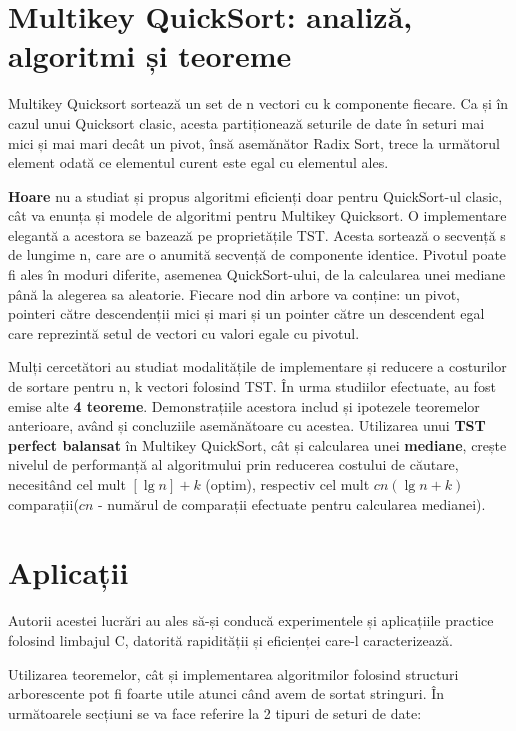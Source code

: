 \documentclass[12pt,a4paper]{article}
\begin{document}
\begin{singlespace}
\section{Multikey QuickSort: analiză, algoritmi și teoreme}
Multikey Quicksort sortează un set de n vectori cu k componente fiecare. Ca și în cazul unui Quicksort clasic, acesta partiționează seturile de date în seturi mai mici și mai mari decât un pivot, însă asemănător Radix Sort, trece la următorul element odată ce elementul curent este egal cu elementul ales. 
\par
\textbf{Hoare} nu a studiat și propus algoritmi eficienți doar pentru QuickSort-ul clasic, cât va enunța și modele de algoritmi pentru Multikey Quicksort. O implementare elegantă a acestora se bazează pe proprietățile TST. Acesta sortează o secvență s de lungime n, care are o anumită secvență de componente identice. Pivotul poate fi ales în moduri diferite, asemenea QuickSort-ului, de la calcularea unei mediane până la alegerea sa aleatorie. Fiecare nod din arbore va conține: un pivot, pointeri către descendenții mici și mari și un pointer către un descendent egal care reprezintă setul de vectori cu valori egale cu pivotul.
\par
Mulți cercetători au studiat modalitățile de implementare și reducere a costurilor de sortare pentru n, k vectori folosind TST. În urma studiilor efectuate, au fost emise alte \textbf{4 teoreme}. Demonstrațiile acestora includ și ipotezele teoremelor anterioare, având și concluziile asemănătoare cu acestea. Utilizarea unui \textbf{TST perfect balansat} în Multikey QuickSort, cât și calcularea unei \textbf{mediane}, crește nivelul de performanță al algoritmului prin reducerea costului de căutare, necesitând cel mult \([\lg n] + k\) (optim), respectiv cel mult \(cn(\lg n + k)\) comparații(\(cn\) - numărul de comparații efectuate pentru calcularea medianei).


\section{Aplicații}
Autorii acestei lucrări au ales să-și conducă experimentele și aplicațiile practice folosind limbajul C, datorită rapidității și eficienței care-l caracterizează. 

\par
Utilizarea teoremelor, cât și implementarea algoritmilor folosind structuri arborescente pot fi foarte utile atunci când avem de sortat stringuri.
În următoarele secțiuni se va face referire la 2 tipuri de seturi de date:


\end{singlespace}
\end{document}
